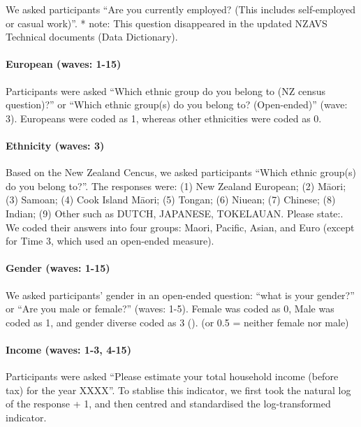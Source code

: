 \documentclass[
  singlecolumn,
  9pt]{article}
\let\oldparagraph\paragraph
\renewcommand{\paragraph}[1]{\oldparagraph{#1}\mbox{}}
\begin{document}
We asked participants ``Are you currently employed? (This includes
self-employed or casual work)''. * note: This question disappeared in
the updated NZAVS Technical documents (Data Dictionary).

\paragraph{European (waves: 1-15)}\label{european-waves-1-15}

Participants were asked ``Which ethnic group do you belong to (NZ census
question)?'' or ``Which ethnic group(s) do you belong to? (Open-ended)''
(wave: 3). Europeans were coded as 1, whereas other ethnicities were
coded as 0.

\paragraph{Ethnicity (waves: 3)}\label{ethnicity-waves-3}

Based on the New Zealand Cencus, we asked participants ``Which ethnic
group(s) do you belong to?''. The responses were: (1) New Zealand
European; (2) Māori; (3) Samoan; (4) Cook Island Māori; (5) Tongan; (6)
Niuean; (7) Chinese; (8) Indian; (9) Other such as DUTCH, JAPANESE,
TOKELAUAN. Please state:. We coded their answers into four groups:
Maori, Pacific, Asian, and Euro (except for Time 3, which used an
open-ended measure).

\paragraph{Gender (waves: 1-15)}\label{gender-waves-1-15}

We asked participants' gender in an open-ended question: ``what is your
gender?'' or ``Are you male or female?'' (waves: 1-5). Female was coded
as 0, Male was coded as 1, and gender diverse coded as 3
(). (or 0.5
= neither female nor male)

\paragraph{Income (waves: 1-3, 4-15)}\label{income-waves-1-3-4-15}

Participants were asked ``Please estimate your total household income
(before tax) for the year XXXX''. To stablise this indicator, we first
took the natural log of the response + 1, and then centred and
standardised the log-transformed indicator.
\end{document}

